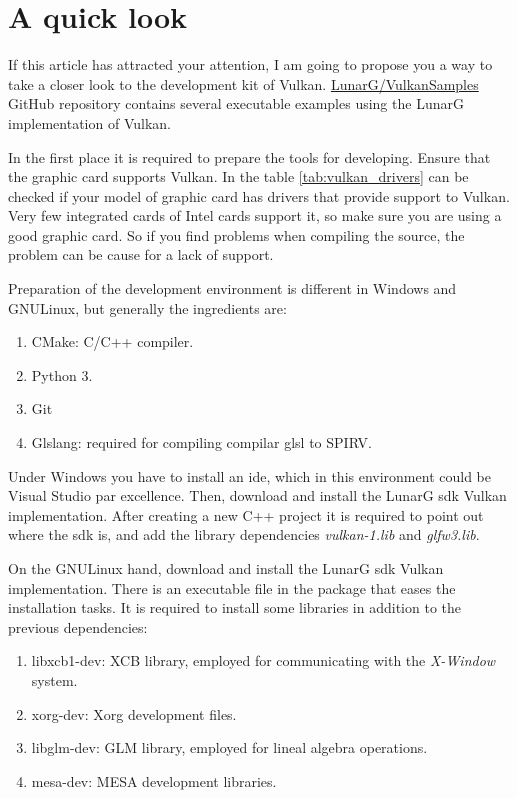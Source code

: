 \chapter{A quick look}
If this article has attracted your attention, I am going to propose you a way to take a closer look to the development
kit of Vulkan. \href{https://github.com/LunarG/VulkanSamples}{LunarG/VulkanSamples} GitHub repository contains several
executable examples using the LunarG implementation of Vulkan.

In the first place it is required to prepare the tools for developing. Ensure that the graphic card supports Vulkan. In
the table \ref{tab:vulkan_drivers} can be checked if your model of graphic card has drivers that provide support to
Vulkan. Very few integrated cards of Intel cards support it, so make sure you are using a good graphic card. So if you
find problems when compiling the source, the problem can be cause for a lack of support.

Preparation of the development environment is different in Windows and GNU\/Linux, but generally the ingredients are:
\begin{enumerate}
    \item CMake: C/C++ compiler.
    \item Python 3.
    \item Git
    \item Glslang: required for compiling compilar \gls{glsl} to SPIRV.
\end{enumerate}

Under Windows you have to install an \gls{ide}, which in this environment could be Visual Studio par excellence. Then,
download and install the LunarG \gls{sdk} Vulkan implementation. After creating a new C++ project it is required to
point out where the \gls{sdk} is, and add the library dependencies \emph{vulkan-1.lib} and \emph{glfw3.lib}.

On the GNU\/Linux hand, download and install the LunarG \gls{sdk} Vulkan implementation. There is an executable file
in the package that eases the installation tasks. It is required to install some libraries in addition to the
previous dependencies:
\begin{enumerate}
    \item libxcb1-dev: XCB library, employed for communicating with the \emph{X-Window} system.
    \item xorg-dev: Xorg development files.
    \item libglm-dev: GLM library, employed for lineal algebra operations.
    \item mesa-dev: MESA development libraries.
\end{enumerate}

